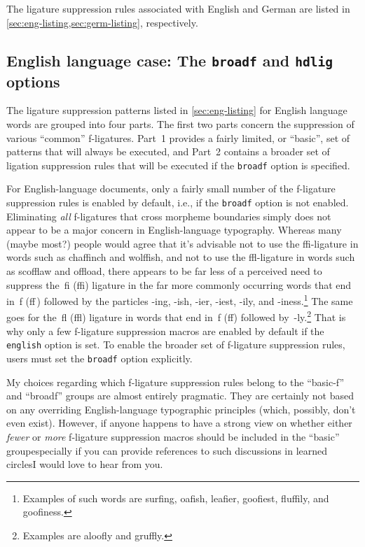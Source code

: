\documentclass[11pt]{article}
\newcommand{\opt}[1]{\texttt{#1}}
\begin{document}
The ligature suppression rules associated with English and German are listed in \cref{sec:eng-listing,sec:germ-listing}, respectively.



\subsection[English language case: The broadf and hdlig options]{English language case: The \opt{broadf} and \opt{hdlig} options} \label{sec:eng-opt}

The ligature suppression patterns listed in \cref{sec:eng-listing} for English language words are grouped into four parts. The first two parts concern the suppression of various \enquote{common} f-ligatures. Part~1 provides a fairly limited, or \enquote{basic}, set of patterns that will always be executed, and Part~2 contains a broader set of ligation suppression rules that will be executed if the \opt{broadf} option is specified. 

For English-language documents, only a fairly small number of the f-ligature suppression rules is enabled by default, i.e., if the \opt{broadf} option is not enabled. Eliminating \emph{all} f-ligatures that cross morpheme boundaries simply does not appear to be a major concern in English-language typography. Whereas many (maybe most?) people would agree that it's advisable not to use the ffi-ligature in words such as chaffinch and wolffish, and not to use the ffl-ligature in words such as scofflaw and offload, there appears to be far less of a perceived need to suppress the~fi (ffi) ligature in the far more commonly occurring words that end in~f (ff\,) followed by the particles -ing, -ish, -ier, -iest, -ily, and -iness.\footnote{Examples of such words are sur\mbox{fi}ng, oa\mbox{fi}sh, lea\mbox{fi}er, goo\mbox{fi}est, flu\mbox{ffi}ly, and goo\mbox{fi}ness.} The same goes for the~fl (ffl) ligature in words that end in~f (ff) followed by~-ly.\footnote{Examples are \mbox{aloofly} and \mbox{gruffly}.} That is why only a few f-ligature suppression macros are enabled by default if the \opt{english} option is set. To enable the broader set of f-ligature suppression rules, users must set the \opt{broadf} option explicitly.

My choices regarding which f-ligature suppression rules belong to the \enquote{basic-f} and \enquote{broadf} groups are almost entirely pragmatic. They are certainly not based on any overriding English-language typographic principles (which, possibly, don't even exist). However, if anyone happens to have a strong view on whether either \emph{fewer} or \emph{more} f-ligature suppression macros should be included in the \enquote{basic} group\textemdash especially if you can provide references to such discussions in learned circles\textemdash I would love to hear from you.
\end{document}
